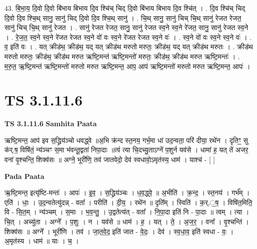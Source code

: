 \documentclass[17pt]{extarticle}
\begin{document}
43. बि॒भा॒य॒ दि॒वो दि॒वो बि॑भाय बिभाय दि॒व श्चि॑च् चिद् दि॒वो बि॑भाय बिभाय दि॒व श्चि॑त् । . दि॒व श्चि॑च् चिद् दि॒वो दि॒व श्चि॒थ् सानु॒ सानु॑ चिद् दि॒वो दि॒व श्चि॒थ् सानु॑ । . चि॒थ् सानु॒ सानु॑ चिच् चि॒थ् सानु॑ रेजत रेजत॒ सानु॑ चिच् चि॒थ् सानु॑ रेजत । . सानु॑ रेजत रेजत॒ सानु॒ सानु॑ रेजत स्व॒ने स्व॒ने रे॑जत॒ सानु॒ सानु॑ रेजत स्व॒ने । . रे॒ज॒त॒ स्व॒ने स्व॒ने रे॑जत रेजत स्व॒ने वो॑ वः स्व॒ने रे॑जत रेजत स्व॒ने वः॑ । . स्व॒ने वो॑ वः स्व॒ने स्व॒ने वः॑ । . व॒ इति॑ वः । . यत् क्रीड॑थ॒ क्रीड॑थ॒ यद् यत् क्रीड॑थ मरुतो मरुतः॒ क्रीड॑थ॒ यद् यत् क्रीड॑थ मरुतः । . क्रीड॑थ मरुतो मरुतः॒ क्रीड॑थ॒ क्रीड॑थ मरुत ऋष्टि॒मन्त॑ ऋष्टि॒मन्तो॑ मरुतः॒ क्रीड॑थ॒ क्रीड॑थ मरुत ऋष्टि॒मन्तः॑ । . म॒रु॒त॒ ऋ॒ष्टि॒मन्त॑ ऋष्टि॒मन्तो॑ मरुतो मरुत ऋष्टि॒मन्त॒ आप॒ आप॑ ऋष्टि॒मन्तो॑ मरुतो मरुत ऋष्टि॒मन्त॒ आपः॑ । \newline
\pagebreak
{}

\section{ TS 3.1.11.6 }

\textbf{TS 3.1.11.6 } \newline
\textbf{Samhita Paata} \newline

ऋष्टि॒मन्त॒ आप॑ इव स॒द्ध्रिय॑ञ्चो धवद्ध्वे ॥अ॒भि क्र॑न्द स्त॒नय॒ गर्भ॒मा धा॑ उद॒न्वता॒ परि॑ दीया॒ रथे॑न । दृतिꣳ॒॒ सु क॑र्.ष॒ विषि॑तं॒ न्य॑ञ्चꣳ स॒मा भ॑वन्तू॒द्वता॑ निपा॒दाः ॥त्वं त्या चि॒दच्यु॒ताऽग्ने॑ प॒शुर्न यव॑से । धामा॑ ह॒ यत् ते॑ अजर॒ वना॑ वृ॒श्चन्ति॒ शिक्व॑सः ॥ अग्ने॒ भूरी॑णि॒ तव॑ जातवेदो॒ देव॑ स्वधावो॒ऽमृत॑स्य॒ धाम॑ । याश्च॑ - [  ] \newline

\textbf{Pada Paata} \newline

ऋ॒ष्टि॒मन्त॒ इत्यृ॑ष्टि-मन्तः॑ । आपः॑ । इ॒व॒ । स॒द्ध्रिय॑ञ्चः । ध॒व॒द्ध्वे॒ ॥ अ॒भीति॑ । क्र॒न्द॒ । स्त॒नय॑ । गर्भ᳚म् । एति॑ । धाः॒ । उ॒द॒न्वतेत्यु॑दन्न् - वता᳚ । परीति॑ । दी॒य॒ । रथे॑न ॥ दृति᳚म् । स्विति॑ । क॒र्.॒ष॒ । विषि॑त॒मिति॒ वि - सि॒त॒म् । न्य॑ञ्चम् । स॒माः । भ॒व॒न्तु॒ । उ॒द्वतेत्य॑त् - वता᳚ । नि॒पा॒दा इति॑ नि - पा॒दाः ॥ त्वम् । त्या । चि॒त् । अच्यु॑ता । अग्ने᳚ । प॒शुः । न । यव॑से ॥ धाम॑ । ह॒ । यत् । ते॒ । अ॒ज॒र॒ । वना᳚ । वृ॒श्चन्ति॑ । शिक्व॑सः ॥ अग्ने᳚ । भूरी॑णि । तव॑ । जा॒त॒वे॒द॒ इति॑ जात - वे॒दः॒ । देव॑ । स्व॒धा॒व॒ इति॑ स्वधा - वः॒ । अ॒मृत॑स्य । धाम॑ ॥ याः । च॒ ।  \newline
\end{document}
